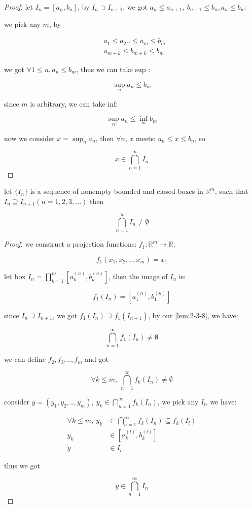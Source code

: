 \begin{proof}
    let $I_n = [a_n, b_n]$, by $I_n \supset I_{n+1}$, we got $a_n \le a_{n+1},\: b_{n+1} \le b_n, a_n \le b_n$:

    we pick any $m$, by 

    \begin{align*}
        & a_1 \le a_2 .. \le a_m \le b_m \\
        & a_{m+k} \le b_{m+k} \le b_m 
    \end{align*}

    we got $\forall 1 \le n , a_n \le b_m$, thus we can take sup :

    \[
        \sup_{n} a_n \le b_m
    \]

    since $m$ is arbitrary, we can take inf:

    \[
        \sup_{n} a_n \le \inf_{m} b_m
    \]

    now we consider $x = \sup_{n} a_n$, then $\forall n$, $x$ meets:
    $a_n \le x \le b_n$, so 

    \[
        x \in \bigcap_{n=1}^{\infty}I_n
    \]
\end{proof}


\begin{corollary}
    \label{lem:2-3-9}
    let $\{ I_n \}$ is a sequence of nonempty bounded and closed boxes in $\mathbb{R}^m$, such that $I_n \supseteq I_{n+1}(n=1,2,3, ...)$
    then 

    \[
        \bigcap_{n=1}^{\infty} I_n \ne \emptyset
    \]
\end{corollary}

\begin{proof}
    we construct a projection functions: $f_1: \mathbb{R}^m \to \mathbb{R}$:

    \[
        f_1(x_1,x_2,..,x_m) = x_1
    \]

    let box $I_n = \prod_{k=1}^{m}[a_k^{(n)}, b_k^{(n)}]$, then the image of $I_n$ is:

    \[
        f_1(I_n) = [a_1^{(n)}, b_1^{(n)}]
    \]

    since $I_n \supseteq I_{n+1}$, we got $f_1(I_n) \supseteq f_1(I_{n+1})$, by our \autoref{lem:2-3-8}, we have:

    \[
        \bigcap_{n=1}^{\infty}f_1(I_n) \ne \emptyset
    \]

    we can define $f_2,f_3,..,f_m$ and got


    \[
        \forall k \le m,\: \bigcap_{n=1}^{\infty}f_{k}(I_n) \ne \emptyset
    \]

    consider $y = (y_1,y_2,..,y_m),\: y_k \in \bigcap_{n=1}^{\infty}f_{k}(I_n)$, we pick any $I_l$, we have:

    \begin{align*}
        \forall k \le m,\: y_k &\in \bigcap_{n=1}^{\infty}f_{k}(I_n) \subseteq f_k(I_l) \\
        y_k & \in [a_k^{(l)}, b_k^{(l)}] \\
        y & \in I_l
    \end{align*}

    thus we got

    \[
        y \in \bigcap_{n=1}^{\infty}I_n
    \]

\end{proof}

